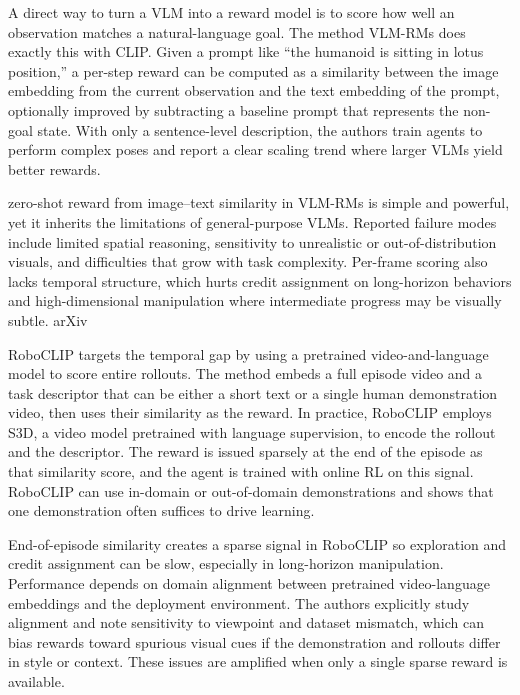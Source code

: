 \documentclass[master,english,final]{kaist-ucs}
\begin{document}
A direct way to turn a VLM into a reward model is to score how well an observation matches a natural-language goal. The method VLM-RMs\cite{rocamonde2023vision} does exactly this with CLIP\cite{radford2021learning}. Given a prompt like “the humanoid is sitting in lotus position,” a per-step reward can be computed as a similarity between the image embedding from the current observation and the text embedding of the prompt, optionally improved by subtracting a baseline prompt that represents the non-goal state. With only a sentence-level description, the authors train agents to perform complex poses and report a clear scaling trend where larger VLMs yield better rewards. 

zero-shot reward from image–text similarity in VLM-RMs\cite{rocamonde2023vision} is simple and powerful, yet it inherits the limitations of general-purpose VLMs. Reported failure modes include limited spatial reasoning, sensitivity to unrealistic or out-of-distribution visuals, and difficulties that grow with task complexity. Per-frame scoring also lacks temporal structure, which hurts credit assignment on long-horizon behaviors and high-dimensional manipulation where intermediate progress may be visually subtle. 
arXiv

RoboCLIP\cite{sontakke2024roboclip} targets the temporal gap by using a pretrained video-and-language model to score entire rollouts. The method embeds a full episode video and a task descriptor that can be either a short text or a single human demonstration video, then uses their similarity as the reward. In practice, RoboCLIP\cite{sontakke2024roboclip} employs S3D\cite{xie2018rethinking}, a video model pretrained with language supervision, to encode the rollout and the descriptor. The reward is issued sparsely at the end of the episode as that similarity score, and the agent is trained with online RL on this signal. RoboCLIP\cite{sontakke2024roboclip} can use in-domain or out-of-domain demonstrations and shows that one demonstration often suffices to drive learning. 

End-of-episode similarity creates a sparse signal in RoboCLIP\cite{sontakke2024roboclip} so exploration and credit assignment can be slow, especially in long-horizon manipulation. Performance depends on domain alignment between pretrained video-language embeddings and the deployment environment. The authors explicitly study alignment and note sensitivity to viewpoint and dataset mismatch, which can bias rewards toward spurious visual cues if the demonstration and rollouts differ in style or context. These issues are amplified when only a single sparse reward is available. 
\end{document}

